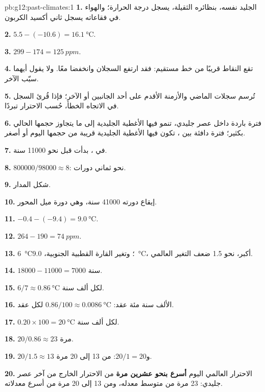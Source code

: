 \begin{solution}{pb:g12:past-climates:1}
\textbf{1.} الجليد نفسه، بنظائره الثقيلة، يسجل
درجة الحرارة؛ والهواء في فقاعاته يسجل ثاني أكسيد الكربون.

\textbf{2.} $5.5 - (-10.6) = \qty{16.1}{\degreeCelsius}$.

\textbf{3.} $299 - 174 = \qty{125}{ppm}$.

\textbf{4.} تقع النقاط قريبًا من خط مستقيم: فقد ارتفع السجلان
وانخفضا معًا. ولا يقول أيهما سبّب الآخر.

\textbf{5.} تُرسم سجلات الماضي والأزمنة الأقدم على أحد
الجانبين أو الآخر؛ فإذا قُرئ السجل في الاتجاه الخطأ، حُسب الاحترار تبردًا.

\textbf{6.}  فترة باردة داخل عصر جليدي، تنمو فيها
الأغطية الجليدية إلى ما يتجاوز حجمها الحالي بكثير؛  فترة دافئة
بين ، تكون فيها الأغطية الجليدية قريبة من حجمها اليوم أو
أصغر.

\textbf{7.} في ، بدأت قبل نحو \num{11000} سنة.

\textbf{8.} $\num{800000}/\num{98000} \approx 8$: نحو ثماني دورات.

\textbf{9.} شكل المدار.

\textbf{10.} إيقاع دورته \num{41000} سنة، وهي دورة ميل
المحور.

\textbf{11.} $-0.4 - (-9.4) = \qty{9.0}{\degreeCelsius}$.

\textbf{12.} $264 - 190 = \qty{74}{ppm}$.

\textbf{13.} \qty{6}{\degreeCelsius}؛ وتغير القارة القطبية الجنوبية، \qty{9.0}{\degreeCelsius}،
أكبر، نحو 1.5 ضعف التغير العالمي.

\textbf{14.} $\num{18000} - \num{11000} = \num{7000}$ سنة.

\textbf{15.} $6/7 \approx \qty{0.86}{\degreeCelsius}$ لكل ألف سنة.

\textbf{16.} الألف سنة مئة عقد: $0.86/100 \approx
\qty{0.0086}{\degreeCelsius}$ لكل عقد.

\textbf{17.} $0.20 \times 100 = \qty{20}{\degreeCelsius}$ لكل ألف سنة.

\textbf{18.} $20/0.86 \approx 23$ مرة.

\textbf{19.} $20/1.5 \approx 13$ و$20/1 = 20$: من 13 إلى 20 مرة.

\textbf{20.} الاحترار العالمي اليوم \textbf{أسرع بنحو عشرين مرة} من
الاحترار الخارج من آخر عصر جليدي: 23 مرة من متوسط معدله، ومن 13 إلى 20 مرة
من أسرع معدلاته.
\end{solution}
